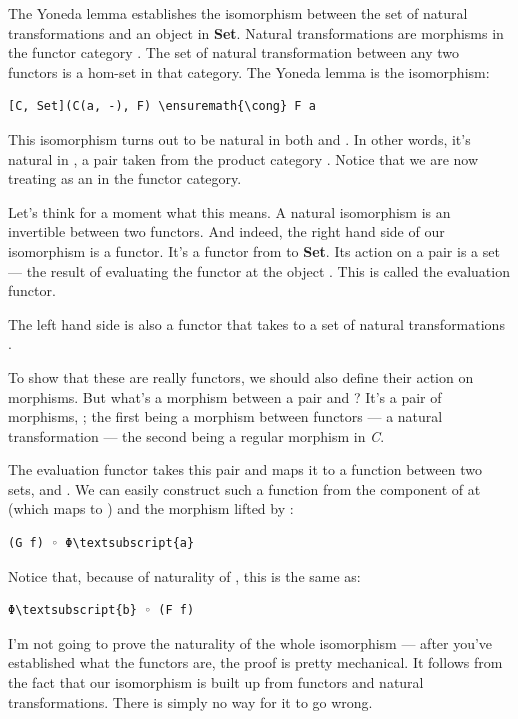 The Yoneda lemma establishes the isomorphism between the set of natural
transformations and an object in \textbf{Set}. Natural transformations
are morphisms in the functor category \code{{[}C, Set{]}}. The set of
natural transformation between any two functors is a hom-set in that
category. The Yoneda lemma is the isomorphism:

\begin{Verbatim}[commandchars=\\\{\}]
[C, Set](C(a, -), F) \ensuremath{\cong} F a
\end{Verbatim}
This isomorphism turns out to be natural in both  and
. In other words, it's natural in , a pair
taken from the product category . Notice
that we are now treating  as an  in the functor
category.

Let's think for a moment what this means. A natural isomorphism is an
invertible  between two functors. And
indeed, the right hand side of our isomorphism is a functor. It's a
functor from  to \textbf{Set}. Its action on
a pair  is a set --- the result of evaluating the
functor  at the object . This is called the
evaluation functor.

The left hand side is also a functor that takes  to a
set of natural transformations .

To show that these are really functors, we should also define their
action on morphisms. But what's a morphism between a pair
 and ? It's a pair of morphisms,
; the first being a morphism between functors --- a
natural transformation --- the second being a regular morphism in
\emph{C}.

The evaluation functor takes this pair  and maps it to a
function between two sets,  and . We can
easily construct such a function from the component of  at
 (which maps  to ) and the morphism
 lifted by :

\begin{Verbatim}[commandchars=\\\{\}]
(G f) ◦ Φ\textsubscript{a}
\end{Verbatim}
Notice that, because of naturality of , this is the same as:

\begin{Verbatim}[commandchars=\\\{\}]
Φ\textsubscript{b} ◦ (F f)
\end{Verbatim}
I'm not going to prove the naturality of the whole isomorphism --- after
you've established what the functors are, the proof is pretty
mechanical. It follows from the fact that our isomorphism is built up
from functors and natural transformations. There is simply no way for it
to go wrong.

